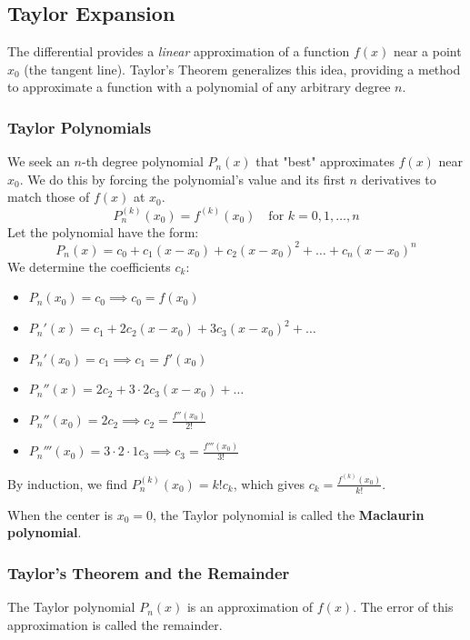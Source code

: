 \subsection{Taylor Expansion}

The differential provides a \textit{linear} approximation of a function $f(x)$ near a point $x_0$ (the tangent line). Taylor's Theorem generalizes this idea, providing a method to approximate a function with a polynomial of any arbitrary degree $n$.

\subsubsection{Taylor Polynomials}

We seek an $n$-th degree polynomial $P_n(x)$ that "best" approximates $f(x)$ near $x_0$. We do this by forcing the polynomial's value and its first $n$ derivatives to match those of $f(x)$ at $x_0$.
\[
P_n^{(k)}(x_0) = f^{(k)}(x_0) \quad \text{for } k=0, 1, \dots, n
\]
Let the polynomial have the form:
\[
P_n(x) = c_0 + c_1(x-x_0) + c_2(x-x_0)^2 + \dots + c_n(x-x_0)^n
\]
We determine the coefficients $c_k$:
\begin{itemize}
    \item $P_n(x_0) = c_0 \implies c_0 = f(x_0)$
    \item $P_n'(x) = c_1 + 2c_2(x-x_0) + 3c_3(x-x_0)^2 + \dots$
    \item $P_n'(x_0) = c_1 \implies c_1 = f'(x_0)$
    \item $P_n''(x) = 2c_2 + 3 \cdot 2 c_3(x-x_0) + \dots$
    \item $P_n''(x_0) = 2c_2 \implies c_2 = \frac{f''(x_0)}{2!}$
    \item $P_n'''(x_0) = 3 \cdot 2 \cdot 1 c_3 \implies c_3 = \frac{f'''(x_0)}{3!}$
\end{itemize}
By induction, we find $P_n^{(k)}(x_0) = k! c_k$, which gives $c_k = \frac{f^{(k)}(x_0)}{k!}$.

\begin{definition}
When the center is $x_0 = 0$, the Taylor polynomial is called the \textbf{Maclaurin polynomial}.
\end{definition}

\subsubsection{Taylor's Theorem and the Remainder}

The Taylor polynomial $P_n(x)$ is an approximation of $f(x)$. The error of this approximation is called the remainder.

